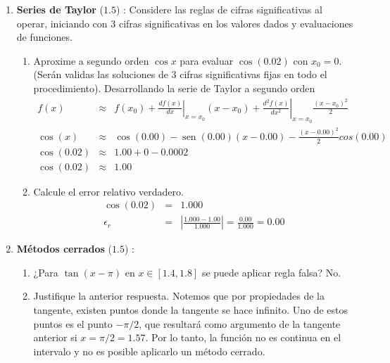 \documentclass[12pt]{article}
\renewcommand{\sin}{\operatorname{sen}}
\DeclareMathOperator{\sen}{sen}
\renewcommand{\sin}{\sen}
\begin{document}
  \begin{enumerate}[leftmargin=*,widest=9]
    \item \textbf{Series de Taylor} ($1.5$) : Considere las reglas de cifras significativas al operar, iniciando con 3 cifras significativas en los valores dados y evaluaciones de funciones.
    \begin{enumerate}[label=\alph*]
    \item Aproxime a segundo orden $\cos x$ para evaluar $\cos (0.02)$ con $x_0 = 0$. 
    (Serán validas las soluciones de 3 cifras significativas fijas en todo el procedimiento).
    Desarrollando la serie de Taylor a segundo orden
    \begin{eqnarray*}
    f(x) & \approx & f(x_0) + \left.\frac{df(x)}{dx}\right|_{x=x_0}(x-x_0)+ \left.\frac{d^2f(x)}{dx^2}\right|_{x=x_0}\frac{(x-x_0)^2}{2}\\
    \cos(x) & \approx & \cos(0.00) - \sin(0.00)(x-0.00) - \frac{(x - 0.00)^2}{2}cos(0.00) \\
    \cos(0.02) & \approx & 1.00 + 0 - 0.0002\\
    \cos(0.02) & \approx & 1.00
    \end{eqnarray*}
    \item Calcule el error relativo verdadero.
    \begin{eqnarray*}
    \cos(0.02) & = & 1.000\\
    \epsilon_r & = & \left| \frac{1.000 - 1.00}{1.000} \right| = \frac{0.00}{1.000} = 0.00  
    \end{eqnarray*}
    \end{enumerate}
    \item \textbf{Métodos cerrados} ($1.5$) :
    \begin{enumerate}[label=\alph*]
    \item ¿Para $\tan (x - \pi)$ en $x \in \left[ 1.4, 1.8 \right]$ se puede aplicar regla falsa?
    No.
    \item Justifique la anterior respuesta.
    Notemos que por propiedades de la tangente, existen puntos donde la tangente se hace infinito. Uno de estos puntos es el punto \(-\pi / 2\), que resultará como argumento de la tangente anterior si \(x = \pi / 2 = 1.57 \). Por lo tanto, la función no es continua en el intervalo y no es posible aplicarlo un método cerrado.
   \begin{eqnarray*}

\end{eqnarray*}
\end{enumerate}
\end{enumerate}
\end{document}
